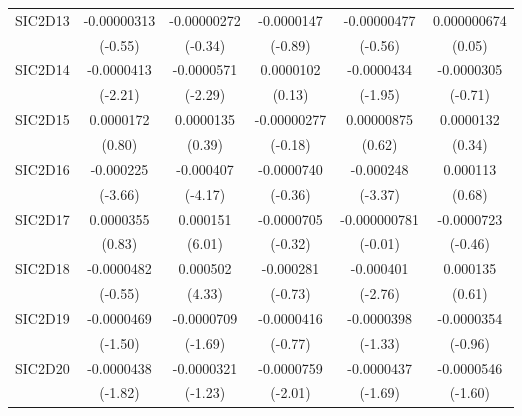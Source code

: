 \begin{table}[htbp]
\begin{tabular}{l*{5}{c}}
SIC2D13     & -0.00000313         & -0.00000272         &  -0.0000147         & -0.00000477         & 0.000000674         \\
            &     (-0.55)         &     (-0.34)         &     (-0.89)         &     (-0.56)         &      (0.05)         \\
SIC2D14     &  -0.0000413\sym{*}  &  -0.0000571\sym{*}  &   0.0000102         &  -0.0000434         &  -0.0000305         \\
            &     (-2.21)         &     (-2.29)         &      (0.13)         &     (-1.95)         &     (-0.71)         \\
SIC2D15     &   0.0000172         &   0.0000135         & -0.00000277         &  0.00000875         &   0.0000132         \\
            &      (0.80)         &      (0.39)         &     (-0.18)         &      (0.62)         &      (0.34)         \\
SIC2D16     &   -0.000225\sym{***}&   -0.000407\sym{***}&  -0.0000740         &   -0.000248\sym{***}&    0.000113         \\
            &     (-3.66)         &     (-4.17)         &     (-0.36)         &     (-3.37)         &      (0.68)         \\
SIC2D17     &   0.0000355         &    0.000151\sym{***}&  -0.0000705         &-0.000000781         &  -0.0000723         \\
            &      (0.83)         &      (6.01)         &     (-0.32)         &     (-0.01)         &     (-0.46)         \\
SIC2D18     &  -0.0000482         &    0.000502\sym{***}&   -0.000281         &   -0.000401\sym{**} &    0.000135         \\
            &     (-0.55)         &      (4.33)         &     (-0.73)         &     (-2.76)         &      (0.61)         \\
SIC2D19     &  -0.0000469         &  -0.0000709         &  -0.0000416         &  -0.0000398         &  -0.0000354         \\
            &     (-1.50)         &     (-1.69)         &     (-0.77)         &     (-1.33)         &     (-0.96)         \\
SIC2D20     &  -0.0000438         &  -0.0000321         &  -0.0000759\sym{*}  &  -0.0000437         &  -0.0000546         \\
            &     (-1.82)         &     (-1.23)         &     (-2.01)         &     (-1.69)         &     (-1.60)         \\

\end{tabular}
\end{table}

